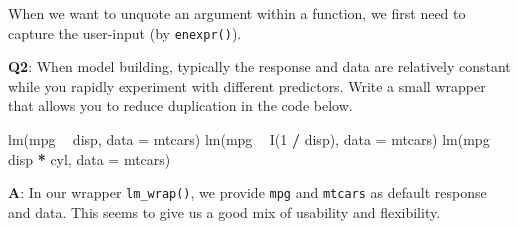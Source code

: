 \documentclass[
]{krantz}
\makeatletter
\newenvironment{Shaded}{\begin{snugshade}}{\end{snugshade}}
\newcommand{\CommentTok}[1]{\textcolor[rgb]{0.56,0.35,0.01}{\textit{#1}}}
\newcommand{\ControlFlowTok}[1]{\textcolor[rgb]{0.13,0.29,0.53}{\textbf{#1}}}
\newcommand{\DataTypeTok}[1]{\textcolor[rgb]{0.13,0.29,0.53}{#1}}
\newcommand{\DecValTok}[1]{\textcolor[rgb]{0.00,0.00,0.81}{#1}}
\newcommand{\KeywordTok}[1]{\textcolor[rgb]{0.13,0.29,0.53}{\textbf{#1}}}
\newcommand{\NormalTok}[1]{#1}
\newcommand{\OperatorTok}[1]{\textcolor[rgb]{0.81,0.36,0.00}{\textbf{#1}}}
\newcommand{\StringTok}[1]{\textcolor[rgb]{0.31,0.60,0.02}{#1}}
\newenvironment{kframe}{%
\medskip{}
\setlength{\fboxsep}{.8em}
 \def\at@end@of@kframe{}%
 \ifinner\ifhmode%
  \def\at@end@of@kframe{\end{minipage}}%
  \begin{minipage}{\columnwidth}%
 \fi\fi%
 \def\FrameCommand##1{\hskip\@totalleftmargin \hskip-\fboxsep
 \colorbox{shadecolor}{##1}\hskip-\fboxsep
     \hskip-\linewidth \hskip-\@totalleftmargin \hskip\columnwidth}%
 \MakeFramed {\advance\hsize-\width
   \@totalleftmargin\z@ \linewidth\hsize
   \@setminipage}}%
 {\par\unskip\endMakeFramed%
 \at@end@of@kframe}
\renewenvironment{Shaded}{\begin{kframe}}{\end{kframe}}
\renewcommand{\KeywordTok} [1]{\textcolor[rgb]{0.00,0.44,0.13}{{#1}}}
\renewcommand{\DataTypeTok}[1]{\textcolor[rgb]{0.56,0.13,0.00}{{#1}}}
\renewcommand{\DecValTok}  [1]{\textcolor[rgb]{0.25,0.63,0.44}{{#1}}}
\renewcommand{\StringTok}  [1]{\textcolor[rgb]{0.25,0.44,0.63}{{#1}}}
\renewcommand{\CommentTok} [1]{\textcolor[rgb]{0.38,0.63,0.69}{{#1}}}
\renewcommand{\NormalTok}  [1]{{#1}}
\makeatother
\begin{document}
When we want to unquote an argument within a function, we first need to capture the user-input (by \texttt{enexpr()}).

\begin{Shaded}
\end{Shaded}

\textbf{{Q2}}: When model building, typically the response and data are relatively constant while you rapidly experiment with different predictors. Write a small wrapper that allows you to reduce duplication in the code below.

\begin{Shaded}
\begin{Highlighting}[]
\KeywordTok{lm}\NormalTok{(mpg }\OperatorTok{~}\StringTok{ }\NormalTok{disp, }\DataTypeTok{data =}\NormalTok{ mtcars)}
\KeywordTok{lm}\NormalTok{(mpg }\OperatorTok{~}\StringTok{ }\KeywordTok{I}\NormalTok{(}\DecValTok{1} \OperatorTok{/}\StringTok{ }\NormalTok{disp), }\DataTypeTok{data =}\NormalTok{ mtcars)}
\KeywordTok{lm}\NormalTok{(mpg }\OperatorTok{~}\StringTok{ }\NormalTok{disp }\OperatorTok{*}\StringTok{ }\NormalTok{cyl, }\DataTypeTok{data =}\NormalTok{ mtcars)}
\end{Highlighting}
\end{Shaded}

\textbf{{A}}: In our wrapper \texttt{lm\_wrap()}, we provide \texttt{mpg} and \texttt{mtcars} as default response and data. This seems to give us a good mix of usability and flexibility.
\end{document}
